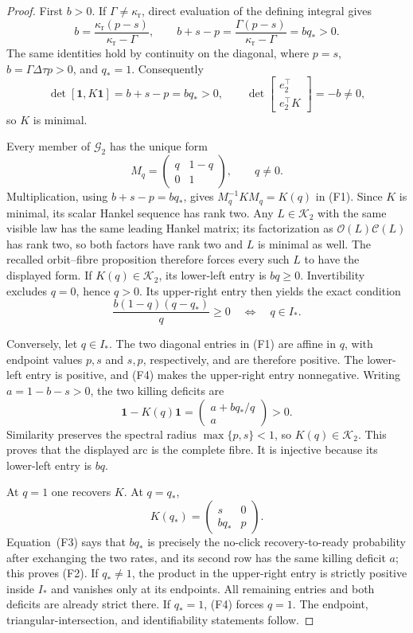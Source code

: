\begin{proof}
First \(b>0\).  If \(\Gamma\ne\kappa_{\mathrm r}\), direct evaluation of
the defining integral gives
\[
 b=\frac{\kappa_{\mathrm r}(p-s)}{\kappa_{\mathrm r}-\Gamma},
 \qquad
 b+s-p=\frac{\Gamma(p-s)}{\kappa_{\mathrm r}-\Gamma}
          =bq_\ast>0.
 \tag{F3}
\]
The same identities hold by continuity on the diagonal, where
\(p=s\), \(b=\Gamma\Delta\tau p>0\), and \(q_\ast=1\).  Consequently
\[
 \det[\mathbf1,K\mathbf1]=b+s-p=bq_\ast>0,
 \qquad
 \det\begin{bmatrix}e_2^\top\\e_2^\top K\end{bmatrix}=-b\ne0,
\]
so \(K\) is minimal.

Every member of \(\mathcal G_2\) has the unique form
\[
 M_q=\begin{pmatrix}q&1-q\\0&1\end{pmatrix},\qquad q\ne0.
\]
Multiplication, using \(b+s-p=bq_\ast\), gives
\(M_q^{-1}KM_q=K(q)\) in \textup{(F1)}.  Since \(K\) is minimal, its scalar
Hankel sequence has rank two.  Any \(L\in\mathcal K_2\) with the same visible
law has the same leading Hankel matrix; its factorization as
\(\mathcal O(L)\mathcal C(L)\) has rank two, so both factors have rank two and
\(L\) is minimal as well.  The recalled orbit--fibre proposition therefore
forces every such \(L\) to have the displayed form.  If
\(K(q)\in\mathcal K_2\), its lower-left entry
is \(bq\ge0\).  Invertibility excludes \(q=0\), hence \(q>0\).  Its
upper-right entry then yields the exact condition
\[
 \frac{b(1-q)(q-q_\ast)}q\ge0
 \quad\Longleftrightarrow\quad q\in I_\ast.
 \tag{F4}
\]

Conversely, let \(q\in I_\ast\).  The two diagonal entries in
\textup{(F1)} are affine in \(q\), with endpoint values \(p,s\) and \(s,p\),
respectively, and are therefore positive.  The lower-left entry is positive,
and \textup{(F4)} makes the upper-right entry nonnegative.  Writing
\(a=1-b-s>0\), the two killing deficits are
\[
 \mathbf1-K(q)\mathbf1
 =\begin{pmatrix}a+bq_\ast/q\\a\end{pmatrix}>0.
 \tag{F5}
\]
Similarity preserves the spectral radius
\(\max\{p,s\}<1\), so \(K(q)\in\mathcal K_2\).  This proves that the
displayed arc is the complete fibre.  It is injective because its lower-left
entry is \(bq\).

At \(q=1\) one recovers \(K\).  At \(q=q_\ast\),
\[
 K(q_\ast)=\begin{pmatrix}s&0\\bq_\ast&p\end{pmatrix}.
\]
Equation~\textup{(F3)} says that \(bq_\ast\) is precisely the no-click
recovery-to-ready probability after exchanging the two rates, and its second
row has the same killing deficit \(a\); this proves \textup{(F2)}.  If
\(q_\ast\ne1\), the product in the upper-right entry is strictly positive
inside \(I_\ast\) and vanishes only at its endpoints.  All remaining entries
and both deficits are already strict there.  If \(q_\ast=1\),
\textup{(F4)} forces \(q=1\).  The endpoint, triangular-intersection, and
identifiability statements follow.
\end{proof}

